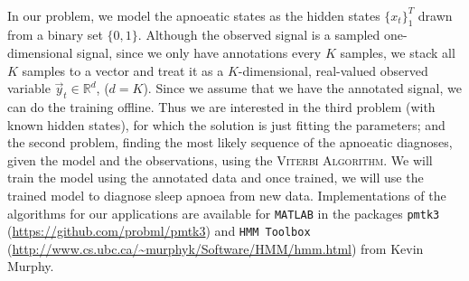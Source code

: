 \paragraph{}
	In our problem, we model the apnoeatic states as the hidden states $\{x_t\}_1^T$ drawn from a binary set $\{0, 1\}$. Although the observed signal is a sampled one-dimensional signal, since we only have annotations every $K$ samples, we stack all $K$ samples to a vector and treat it as a $K$-dimensional, real-valued observed variable $\vec y_t \in \mathbb{R}^d$, ($d = K$). Since we assume that we have the annotated signal, we can do the training offline. Thus we are interested in the third problem (with known hidden states), for which the solution is just fitting the parameters; and the second problem, finding the most likely sequence of the apnoeatic diagnoses, given the model and the observations, using the \textsc{Viterbi Algorithm}. We will train the model using the annotated data and once trained, we will use the trained model to diagnose sleep apnoea from new data. Implementations of the algorithms for our applications are available for \verb!MATLAB!\textsuperscript{\textregistered} in the packages \verb!pmtk3! (\url{https://github.com/probml/pmtk3}) and \verb!HMM Toolbox! (\url{http://www.cs.ubc.ca/~murphyk/Software/HMM/hmm.html}) from Kevin Murphy.
